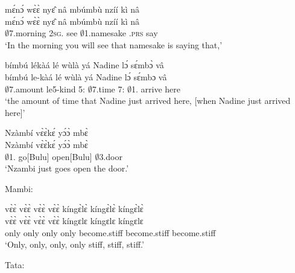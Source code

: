 \begin{exe}[(N234)]
\exN\label{n201}
  \glll mɛ́nɔ́ wɛ̀ɛ̀ nyɛ̂ nâ mbúmbù nzíí kì nâ \\
        mɛ́nɔ́ wɛ̀ɛ̀ nyɛ̂ nâ mbúmbù nzíí kì nâ \\
       $\emptyset$7.morning 2\textsc{sg}.{\FUT} see {\COMP} $\emptyset$1.namesake {\PROG}.\textsc{prs} say {\COMP}  \\
    \trans `In the morning you will see that namesake is saying that,'
 
\exN\label{n202}
  \glll bímbú lékàá lé wùlà yá Nadine lɔ́ sɛ́mbɔ̀ vâ \\
         bímbú le-kàá lé wùlà yá Nadine lɔ́ sɛ́mbɔ vâ \\
        $\emptyset$7.amount le5-kind 5:{\ATT}  $\emptyset$7.time 7:{\ATT}  $\emptyset$1.{\PN} {\RETRO}  arrive here \\
    \trans `the amount of time that Nadine just arrived here, [when Nadine just arrived here]'
 
\exN\label{n203}
  \glll  Nzàmbí vɛ̀ɛ̀kɛ́ yɔ́ɔ̀ mbɛ̀ \\
        Nzàmbí vɛ̀ɛ̀kɛ́ yɔ́ɔ̀ mbɛ̀ \\
        $\emptyset$1.{\PN} go[Bulu] open[Bulu] $\emptyset$3.door  \\
    \trans `Nzambi just goes open the door.'
\end{exe}

\noindent Mambi:

\begin{exe}[(N234)]
\exN\label{n204} 
  \glll vɛ̀ɛ̀ vɛ̀ɛ̀ vɛ̀ɛ̀ vɛ̀ɛ̀ kíngɛ̀lɛ̀ kíngɛ̀lɛ̀ kíngɛ̀lɛ̀ \\
         vɛ̀ɛ̀ vɛ̀ɛ̀ vɛ̀ɛ̀ vɛ̀ɛ̀ kíngɛlɛ kíngɛlɛ kíngɛlɛ \\
        only only only only become.stiff become.stiff become.stiff \\
    \trans `Only, only, only, only stiff, stiff, stiff.'
\end{exe}

\noindent Tata:

